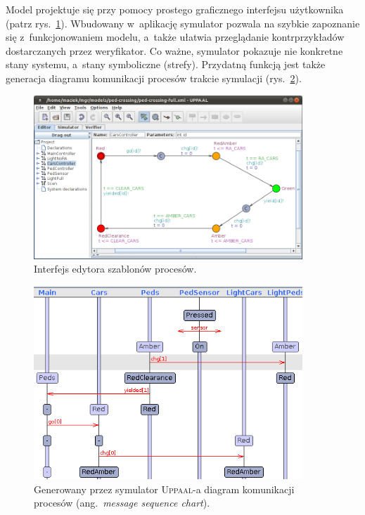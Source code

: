 \documentclass{pracamgr}
\newcommand{\ang}[1]{(ang.~\emph{#1})}
\newcommand{\upp}{\textsc{Uppaal}}
\theoremstyle{plain}
\begin{document}
Model projektuje się przy pomocy prostego graficznego interfejsu
użytkownika (patrz rys.~\ref{img:uppaal-gui}). Wbudowany w~aplikację
symulator pozwala na szybkie zapoznanie się z~funkcjonowaniem modelu,
a~także ułatwia przeglądanie kontrprzykładów dostarczanych przez
weryfikator. Co ważne, symulator pokazuje nie konkretne stany systemu,
a~stany symboliczne (strefy). Przydatną funkcją jest także generacja
diagramu komunikacji procesów trakcie symulacji
(rys.~\ref{img:uppaal-msc}).
\begin{figure}
  \centering
  \includegraphics[width=0.9\textwidth]{img/uppaal-editor.png}
  \caption{Interfejs edytora szablonów procesów.}
  \label{img:uppaal-gui}
\end{figure}

\begin{figure}
  \centering
  \includegraphics[width=0.9\textwidth]{img/uppaal-msc.png}
  \caption{Generowany przez symulator \upp-a diagram komunikacji
    procesów \ang{message sequence chart}.}
  \label{img:uppaal-msc}
\end{figure}
\end{document}

